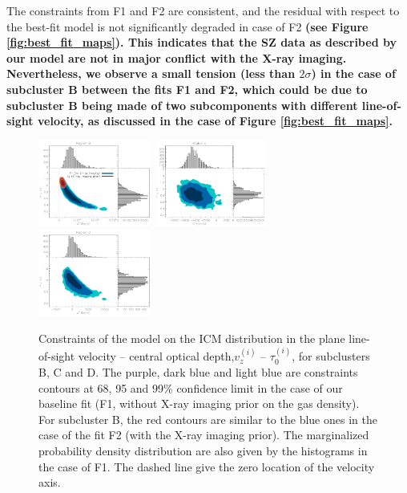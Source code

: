 \documentclass[twocolumn,traditabstract]{aa}
\begin{document}
The constraints from F1 and F2 are consistent, and the residual with respect to the best-fit model is not significantly degraded in case of F2 {\bf (see Figure \ref{fig:best_fit_maps}). This indicates that the SZ data as described by our model are not in major conflict with the X-ray imaging. Nevertheless, we observe a small tension (less than $2 \sigma$) in the case of subcluster B between the fits F1 and F2, which could be due to subcluster B being made of two subcomponents with different line-of-sight velocity, as discussed in the case of Figure \ref{fig:best_fit_maps}.}
\begin{figure}[h]
\centering
\includegraphics[width=0.33\textwidth]{Figure/Tau_vz_2dLikelihoods_B.pdf}
\includegraphics[width=0.33\textwidth]{Figure/Tau_vz_2dLikelihoods_C.pdf}
\includegraphics[width=0.33\textwidth]{Figure/Tau_vz_2dLikelihoods_D.pdf}
\caption{\footnotesize{Constraints of the model on the ICM distribution in the plane line-of-sight velocity -- central optical depth,$v_z^{(i)}$ -- $\tau_0^{(i)}$, for subclusters B, C and D. The purple, dark blue and light blue are constraints contours at 68, 95 and 99\% confidence limit in the case of our baseline fit (F1, without X-ray imaging prior on the gas density). For subcluster B, the red contours are similar to the blue ones in the case of the fit F2 (with the X-ray imaging prior). The marginalized probability density distribution are also given by the histograms in the case of F1. The dashed line give the zero location of the velocity axis.}}
\label{fig:velocity_constraint}
\end{figure}
\end{document}
